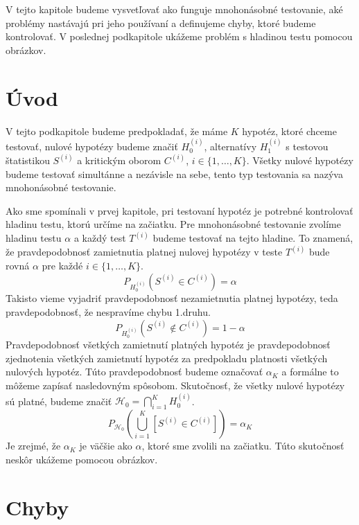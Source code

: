 
V tejto kapitole budeme vysvetľovať ako funguje mnohonásobné testovanie, aké problémy nastávajú pri jeho používaní 
a definujeme chyby, ktoré budeme kontrolovať. 
V poslednej podkapitole ukážeme problém s hladinou testu pomocou obrázkov. 

\section{Úvod}

V tejto podkapitole budeme predpokladať, že máme $K$ hypotéz, ktoré chceme testovať, 
nulové hypotézy budeme značiť $H^{(i)}_0$, alternatívy $H^{(i)}_1$ 
s testovou štatistikou $S^{(i)}$ a kritickým oborom $C^{(i)}$, $i \in \{1, \dots, K\}$. 
Všetky nulové hypotézy budeme testovať simultánne a nezávisle na sebe, 
tento typ testovania sa nazýva mnohonásobné testovanie. 

Ako sme spomínali v prvej kapitole, pri testovaní hypotéz je potrebné kontrolovať hladinu testu, ktorú určíme na začiatku. 
Pre mnohonásobné testovanie zvolíme hladinu testu $\alpha$ a každý test $T^{(i)}$ budeme testovať na tejto hladine. 
To znamená, že pravdepodobnosť zamietnutia platnej nulovej hypotézy v teste $T^{(i)}$ bude rovná $\alpha$ pre každé $i \in \{1, \dots, K\}$.
$$ P_{H^{(i)}_0} (S^{(i)} \in C^{(i)}) = \alpha $$ 
Takisto vieme vyjadriť pravdepodobnosť nezamietnutia platnej hypotézy, teda pravdepodobnosť, že nespravíme chybu 1.druhu. 
$$ P_{H^{(i)}_0} (S^{(i)} \notin C^{(i)}) = 1 - \alpha $$ 
Pravdepodobnosť všetkých zamietnutí platných hypotéz je pravdepodobnosť zjednotenia všetkých zamietnutí hypotéz 
za predpokladu platnosti všetkých nulových hypotéz. 
Túto pravdepodobnosť budeme označovať $\alpha_K$ a formálne to môžeme zapísať nasledovným spôsobom. 
Skutočnosť, že všetky nulové hypotézy sú platné, budeme značiť $ \mathcal{H}_0 = {\bigcap_{i=1}^{K} H^{(i)}_0} $.
$$ P_{\mathcal{H}_0} ( \bigcup_{i=1}^{K} [S^{(i)} \in C^{(i)}] ) = \alpha_K $$ 
Je zrejmé, že $\alpha_K$ je väčšie ako $\alpha$, ktoré sme zvolili na začiatku. 
Túto skutočnosť neskôr ukážeme pomocou obrázkov. 

\section{Chyby}


